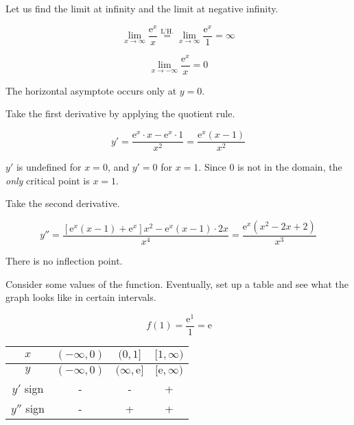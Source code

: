 \documentclass{article}
\begin{document}
\hfill

\noindent Let us find the limit at infinity and the limit at negative infinity.

\begin{equation*}\lim_{x\to \infty} \frac{\mathrm{e}^x}{x} \overset{\text{L'H.}}{=} \lim_{x\to \infty} \frac{\mathrm{e}^x}{1} = \infty\end{equation*}

\begin{equation*}\lim_{x\to -\infty} \frac{\mathrm{e}^x}{x} = 0\end{equation*}

\hfill

\noindent The horizontal asymptote occurs only at $y=0$.

\hfill

\noindent Take the first derivative by applying the quotient rule.

\begin{equation*}y' = \frac{\mathrm{e}^x\cdot x - \mathrm{e}^x\cdot 1}{x^2}=\frac{\mathrm{e}^x(x-1)}{x^2}\end{equation*}

\hfill

\noindent $y'$ is undefined for $x=0$, and $y'=0$ for $x=1$. Since 0 is not in the domain, the \textit{only} critical point is $x = 1$.

\hfill

\noindent Take the second derivative.

\begin{equation*}y'' = \frac{[\mathrm{e}^x(x-1) + \mathrm{e}^x]x^2 - \mathrm{e}^x(x-1) \cdot 2x }{x^4}=\frac{\mathrm{e}^x(x^2-2x + 2)}{x^3}\end{equation*}

\hfill

\noindent There is no inflection point.

\hfill

\noindent Consider some values of the function. Eventually, set up a table and see what the graph looks like in certain intervals.

\begin{equation*}\,f(1) = \frac{\mathrm{e}^1}{1} = \mathrm{e}\end{equation*}

\begin{center}
    \large
    \begin{tabular}{ |c| c c c| } 
    \hline
        $x$ & $(-\infty, 0)$ & $(0, 1]$ & $[1, \infty)$  \\
        \hline
        $y$ & $(-\infty, 0)$ & $(\infty, \mathrm{e}]$ & $[\mathrm{e}, \infty)$\\
        \hline
        $y'$ sign & - & - & + \\
        \hline
        $y''$ sign & - & + & + \\
        \hline
    \end{tabular}
\end{center}
\end{document}
